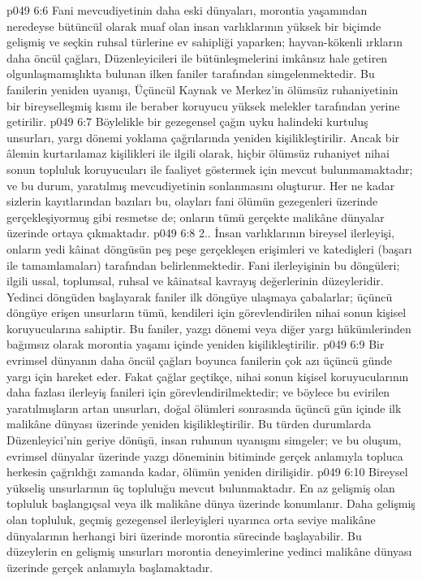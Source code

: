 \vs p049 6:6 Fani mevcudiyetinin daha eski dünyaları, morontia yaşamından neredeyse bütüncül olarak muaf olan insan varlıklarının yüksek bir biçimde gelişmiş ve seçkin ruhsal türlerine ev sahipliği yaparken; hayvan\hyp{}kökenli ırkların daha öncül çağları, Düzenleyicileri ile bütünleşmelerini imkânsız hale getiren olgunlaşmamışlıkta bulunan ilken faniler tarafından simgelenmektedir. Bu fanilerin yeniden uyanışı, Üçüncül Kaynak ve Merkez’in ölümsüz ruhaniyetinin bir bireyselleşmiş kısmı ile beraber koruyucu yüksek melekler tarafından yerine getirilir.
\vs p049 6:7 Böylelikle bir gezegensel çağın uyku halindeki kurtuluş unsurları, yargı dönemi yoklama çağrılarında yeniden kişilikleştirilir. Ancak bir âlemin kurtarılamaz kişilikleri ile ilgili olarak, hiçbir ölümsüz ruhaniyet nihai sonun topluluk koruyucuları ile faaliyet göstermek için mevcut bulunmamaktadır; ve bu durum, yaratılmış mevcudiyetinin sonlanmasını oluşturur. Her ne kadar sizlerin kayıtlarından bazıları bu, olayları fani ölümün gezegenleri üzerinde gerçekleşiyormuş gibi resmetse de; onların tümü gerçekte malikâne dünyalar üzerinde ortaya çıkmaktadır.
\vs p049 6:8 2.\bibnobreakspace {}. İnsan varlıklarının bireysel ilerleyişi, onların yedi kâinat döngüsün peş peşe gerçekleşen erişimleri ve katedişleri (başarı ile tamamlamaları) tarafından belirlenmektedir. Fani ilerleyişinin bu döngüleri; ilgili ussal, toplumsal, ruhsal ve kâinatsal kavrayış değerlerinin düzeyleridir. Yedinci döngüden başlayarak faniler ilk döngüye ulaşmaya çabalarlar; üçüncü döngüye erişen unsurların tümü, kendileri için görevlendirilen nihai sonun kişisel koruyucularına sahiptir. Bu faniler, yazgı dönemi veya diğer yargı hükümlerinden bağımsız olarak morontia yaşamı içinde yeniden kişilikleştirilir.
\vs p049 6:9 Bir evrimsel dünyanın daha öncül çağları boyunca fanilerin çok azı üçüncü günde yargı için hareket eder. Fakat çağlar geçtikçe, nihai sonun kişisel koruyucularının daha fazlası ilerleyiş fanileri için görevlendirilmektedir; ve böylece bu evirilen yaratılmışların artan unsurları, doğal ölümleri sonrasında üçüncü gün içinde ilk malikâne dünyası üzerinde yeniden kişilikleştirilir. Bu türden durumlarda Düzenleyici’nin geriye dönüşü, insan ruhunun uyanışını simgeler; ve bu oluşum, evrimsel dünyalar üzerinde yazgı döneminin bitiminde gerçek anlamıyla topluca herkesin çağrıldığı zamanda kadar, ölümün yeniden dirilişidir.
\vs p049 6:10 Bireysel yükseliş unsurlarının üç topluluğu mevcut bulunmaktadır. En az gelişmiş olan topluluk başlangıçsal veya ilk malikâne dünya üzerinde konumlanır. Daha gelişmiş olan topluluk, geçmiş gezegensel ilerleyişleri uyarınca orta seviye malikâne dünyalarının herhangi biri üzerinde morontia sürecinde başlayabilir. Bu düzeylerin en gelişmiş unsurları morontia deneyimlerine yedinci malikâne dünyası üzerinde gerçek anlamıyla başlamaktadır.
